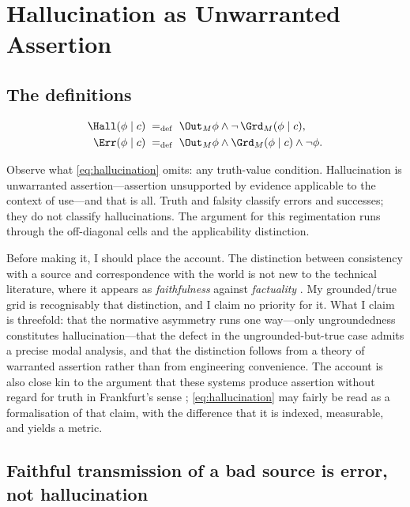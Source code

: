 \section{Hallucination as Unwarranted Assertion}
\label{sec:hallucination}

\subsection{The definitions}

\begin{definition}
\label{def:hallucination}
\begin{align}
  \Hall(\phi \mid c) &\;=_{\mathrm{def}}\; \Out_M \phi \wedge \neg\,\Grd_M(\phi \mid c),
    \label{eq:hallucination}\\
  \Err(\phi \mid c)  &\;=_{\mathrm{def}}\; \Out_M \phi \wedge \Grd_M(\phi \mid c) \wedge \neg \phi.
    \label{eq:error}
\end{align}
\end{definition}

Observe what \eqref{eq:hallucination} omits: any truth-value condition.
Hallucination is unwarranted assertion---assertion unsupported by evidence
applicable to the context of use---and that is all. Truth and falsity classify
errors and successes; they do not classify hallucinations. The argument for this
regimentation runs through the off-diagonal cells and the applicability
distinction.

Before making it, I should place the account. The distinction between consistency
with a source and correspondence with the world is not new to the technical
literature, where it appears as \emph{faithfulness} against \emph{factuality}
\citep{maynez2020,ji2023}. My grounded/true grid is recognisably that
distinction, and I claim no priority for it. What I claim is threefold: that the
normative asymmetry runs one way---only ungroundedness constitutes
hallucination---that the defect in the ungrounded-but-true case admits a precise
modal analysis, and that the distinction follows from a theory of warranted
assertion rather than from engineering convenience. The account is also close
kin to the argument that these systems produce assertion without regard for
truth in Frankfurt's sense \citep{hicks2024}; \eqref{eq:hallucination} may fairly
be read as a formalisation of that claim, with the difference that it is
indexed, measurable, and yields a metric.

\subsection{Faithful transmission of a bad source is error, not hallucination}
\label{sec:error}


